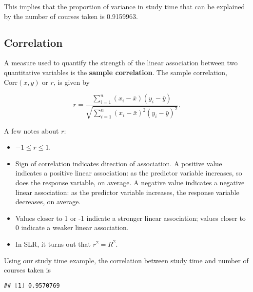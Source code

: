 \documentclass[
]{book}
\newenvironment{Shaded}{\begin{snugshade}}{\end{snugshade}}
\newcommand{\FunctionTok}[1]{\textcolor[rgb]{0.13,0.29,0.53}{\textbf{#1}}}
\newcommand{\NormalTok}[1]{#1}
\newcommand{\SpecialCharTok}[1]{\textcolor[rgb]{0.81,0.36,0.00}{\textbf{#1}}}
\providecommand{\tightlist}{%
  \setlength{\itemsep}{0pt}\setlength{\parskip}{0pt}}
\begin{document}
This implies that the proportion of variance in study time that can be explained by the number of courses taken is 0.9159963.

\hypertarget{correlation}{%
\subsection{Correlation}\label{correlation}}

A measure used to quantify the strength of the linear association between two quantitative variables is the \textbf{sample correlation}. The sample correlation, \(\mbox{Corr}(x,y)\) or \(r\), is given by

\begin{equation} 
r = \frac{\sum\limits_{i=1}^{n}(x_i - \bar{x})(y_i - \bar{y})}{\sqrt{\sum\limits_{i=1}^{n}(x_i - \bar{x})^{2}(y_i - \bar{y})^{2}}}.
\label{eq:corr}
\end{equation}

A few notes about \(r\):

\begin{itemize}
\tightlist
\item
  \(-1 \leq r \leq 1\).
\item
  Sign of correlation indicates direction of association. A positive value indicates a positive linear association: as the predictor variable increases, so does the response variable, on average. A negative value indicates a negative linear association: as the predictor variable increases, the response variable decreases, on average.
\item
  Values closer to 1 or -1 indicate a stronger linear association; values closer to 0 indicate a weaker linear association.
\item
  In SLR, it turns out that \(r^2 = R^2\).
\end{itemize}

Using our study time example, the correlation between study time and number of courses taken is

\begin{Shaded}
\end{Shaded}

\begin{verbatim}
## [1] 0.9570769
\end{verbatim}
\end{document}
